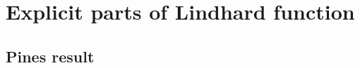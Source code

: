 \documentclass[../../main.tex]{subfiles}
\begin{document}
\section{Explicit parts of Lindhard function}

\subsection{Pines result}
\end{document}
